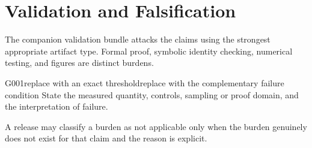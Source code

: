 \section{Validation and Falsification}

The companion validation bundle attacks the claims using the strongest appropriate artifact type. Formal proof, symbolic identity checking, numerical testing, and figures are distinct burdens.

\begin{gateblock}{G001}{replace with an exact threshold}{replace with the complementary failure condition}
State the measured quantity, controls, sampling or proof domain, and the interpretation of failure.
\end{gateblock}

A release may classify a burden as not applicable only when the burden genuinely does not exist for that claim and the reason is explicit.
